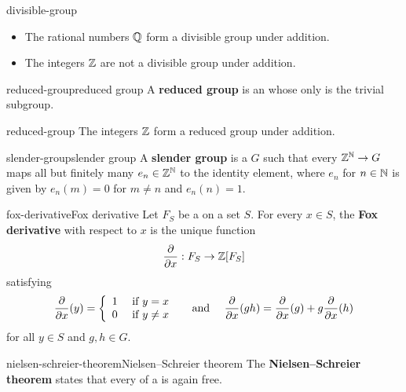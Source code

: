 \begin{example}{divisible-group}
    \begin{itemize}
        \item The rational numbers $\mathbb{Q}$ form a divisible group under addition.
        \item The integers $\mathbb{Z}$ are not a divisible group under addition.
    \end{itemize}
\end{example}

\begin{topic}{reduced-group}{reduced group}
    A \textbf{reduced group} is an  whose only   is the trivial subgroup.
\end{topic}

\begin{example}{reduced-group}
    The integers $\mathbb{Z}$ form a reduced group under addition.
\end{example}

\begin{topic}{slender-group}{slender group}
    A \textbf{slender group} is a   $G$ such that every  $\mathbb{Z}^{\mathbb{N}} \to G$ maps all but finitely many $e_n \in \mathbb{Z}^{\mathbb{N}}$ to the identity element, where $e_n$ for $n \in \mathbb{N}$ is given by $e_n(m) = 0$ for $m \ne n$ and $e_n(n) = 1$.
\end{topic}

\begin{topic}{fox-derivative}{Fox derivative}
    Let $F_S$ be a  on a set $S$. For every $x \in S$, the \textbf{Fox derivative} with respect to $x$ is the unique function
    \[ \frac{\partial}{\partial x} : F_S \to \mathbb{Z}[F_S] \]
    satisfying
    \[ \frac{\partial}{\partial x}(y) = \left\{ \begin{array}{cl} 1 & \textup{ if } y = x \\ 0 & \text{ if } y \ne x \end{array} \right. \quad \textup{ and } \quad \frac{\partial}{\partial x}(g h) = \frac{\partial}{\partial x}(g) + g \frac{\partial}{\partial x}(h) \]
    for all $y \in S$ and $g, h \in G$.
\end{topic}

\begin{topic}{nielsen-schreier-theorem}{Nielsen--Schreier theorem}
    The \textbf{Nielsen--Schreier theorem} states that every  of a  is again free.
\end{topic}

